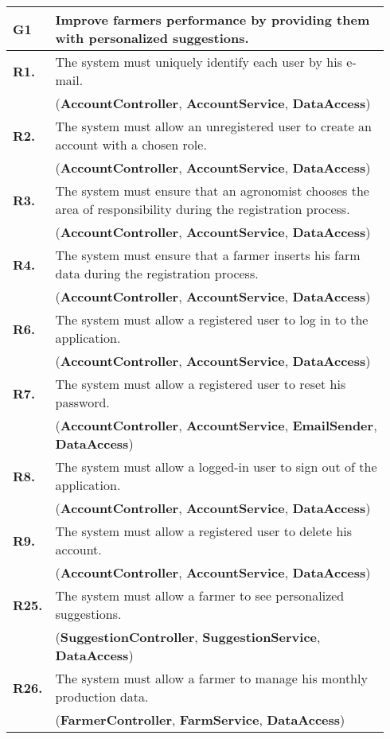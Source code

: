 \begin{longtable}{p{0.06\linewidth} p{0.88\linewidth}} 
    \toprule
    \textbf{G1} & Improve farmers performance by providing them with personalized suggestions. \\
    \midrule		
	\textbf{R1.} & The system must uniquely identify each user by his e-mail. \\
	& (\textbf{AccountController}, \textbf{AccountService}, \textbf{DataAccess})\\
	\textbf{R2.} & The system must allow an unregistered user to create an account with a chosen role. \\
    & (\textbf{AccountController}, \textbf{AccountService}, \textbf{DataAccess})\\
	\textbf{R3.} & The system must ensure that an agronomist chooses the area of responsibility during the registration process. \\
	& (\textbf{AccountController}, \textbf{AccountService}, \textbf{DataAccess})\\
	\textbf{R4.} & The system must ensure that a farmer inserts his farm data during the registration process.\\
	& (\textbf{AccountController}, \textbf{AccountService}, \textbf{DataAccess})\\
	\textbf{R6.} & The system must allow a registered user to log in to the application. \\
	& (\textbf{AccountController}, \textbf{AccountService}, \textbf{DataAccess})\\
	\textbf{R7.} & The system must allow a registered user to reset his password. \\
	& (\textbf{AccountController}, \textbf{AccountService}, \textbf{EmailSender}, \textbf{DataAccess})\\
	\textbf{R8.} & The system must allow a logged-in user to sign out of the application.\todo{stateless}\\
	& (\textbf{AccountController}, \textbf{AccountService}, \textbf{DataAccess})\\
	\textbf{R9.} & The system must allow a registered user to delete his account. \\
	& (\textbf{AccountController}, \textbf{AccountService}, \textbf{DataAccess})\\
	
	\textbf{R25.} & The system must allow a farmer to see personalized suggestions.\\
	& (\textbf{SuggestionController}, \textbf{SuggestionService}, \textbf{DataAccess})\\
	\textbf{R26.} & The system must allow a farmer to manage his monthly production data.\\
	& (\textbf{FarmerController}, \textbf{FarmService}, \textbf{DataAccess})\\
	

\end{longtable}
